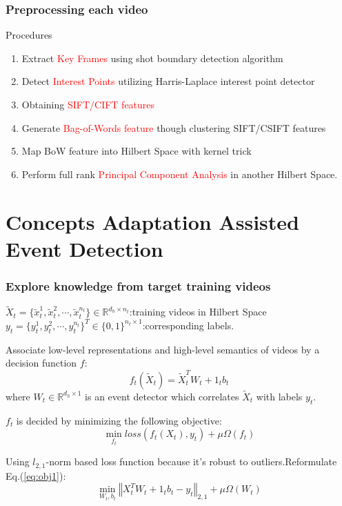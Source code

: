 \documentclass{beamer}
\begin{document}
\begin{frame}\frametitle{Preprocessing each video}
\begin{exampleblock}{Procedures}
\begin{enumerate}
\item Extract \textcolor{red}{Key Frames} using shot boundary detection algorithm
\item Detect \textcolor{red}{Interest Points} utilizing Harris-Laplace interest point detector
\item Obtaining \textcolor{red}{SIFT/CIFT features}
\item Generate \textcolor{red}{Bag-of-Words feature} though clustering SIFT/CSIFT features
\item Map BoW feature into Hilbert Space with kernel trick
\item Perform full rank \textcolor{red}{Principal Component Analysis} in another Hilbert Space.
\end{enumerate}
\end{exampleblock}
\end{frame}

\section{Concepts Adaptation Assisted Event Detection}
\begin{frame}\frametitle{Explore knowledge from target training videos}
$\tilde{X}_t=\{\tilde{x}_t^1,\tilde{x}_t^2,\cdots,\tilde{x}_t^{n_t}\}\in\mathbb{R}^{d_h\times n_t}$:training videos in Hilbert Space\;\\
$y_t=\{y_t^1,y_t^2,\cdots,y_t^{n_t}\}^T\in\{0,1\}^{n_t\times 1}$:corresponding labels.
\begin{block}{}
Associate low-level representations and high-level semantics of videos by a decision function $f$:
\begin{equation}\label{eq:decisionfun}
f_t(\tilde{X}_t)=\tilde{X}_t^TW_t+1_tb_t
\end{equation}
where $W_t\in\mathbb{R}^{d_h\times 1}$ is an event detector which correlates $\tilde{X}_t$ with labels $y_t$.
\end{block}

\begin{block}{}
$f_t$ is decided by minimizing the following objective:
\begin{equation}\label{eq:decidef}
\min_{f_t} loss(f_t(X_t),y_t)+\mu\Omega(f_t)
\end{equation}
\end{block}

\begin{block}{}
Using $l_{2,1}$-norm based loss function because it's robust to outliers.Reformulate Eq.(\ref{eq:obj1}):
\begin{equation}\label{eq:obj1}
\min_{W_t,b_t}\left\Vert{{X}_t^TW_t+1_tb_t-y_t}\right\Vert_{2,1}+\mu\Omega(W_t)
\end{equation}
\end{block}
\end{frame}
\end{document}
